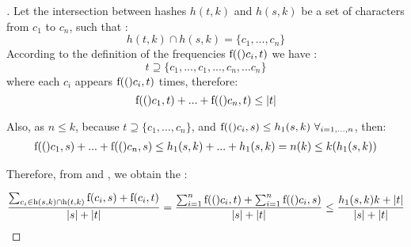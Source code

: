 
\begin{proof}[]
	Let the intersection between hashes $h(t,k)$ and $h(s,k)$ be a set of characters from $c_1$ to $c_n$, such that : 
	\begin{equation} \label{eq:intersection}
	h(t,k) \cap h(s,k)=\{c_1,...,c_n\}
	\end{equation}
	According to the definition of the frequencies $\textnormal{f}(()c_i, t)$ we have : 
	\begin{equation} \label{eq:tsub}
	t \supseteq \{c_1,...,c_1,...,c_n,...c_n\}
	\end{equation}
	where each $c_i$ appears $\textnormal{f}(()c_i,t)$ times,  
	therefore: 
	\begin{equation} \label{eq:proof1}
	\textnormal{f}(()c_1,t) + ... + \textnormal{f}(()c_n, t) \leq |t|
	\end{equation}
	
	\noindent	Also, as $n \leq k$, because $t \supseteq \{c_1,...,c_n\}$, and $\textnormal{f}(()c_i,s) \leq h_1(s,k)~ \forall_ {i=1,...,n}$, then: 
	\begin{equation} \label{eq:proof2}
	\begin{split}
	\textnormal{f}(()c_1,s) + ... + \textnormal{f}(()c_n,s) \leq h_1(s,k) + ... + h_1(s,k)
	=n (k) \leq k (h_1(s,k))
	\end{split}
	\end{equation}
	
	Therefore, from  and , we obtain the :
	
	\begin{equation} \label{eq:obt1}
	\begin{split}
	\frac
	{\sum_{c_i \in \textnormal{h}(s,k) \cap \textnormal{h}(t,k)} \textnormal{f}(c_i,s)+\textnormal{f}(c_i,t)}
	{|s|+|t|}
	=\frac
	{\sum_{i=1}^n \textnormal{f}(()c_i,t) + \sum_{i=1}^n \textnormal{f}(()c_i,s)}
	{|s|+|t|}
	\leq \frac{h_1(s,k) k + |t|}{|s| + |t|} 
	\end{split}
	\end{equation}



\end{proof}
